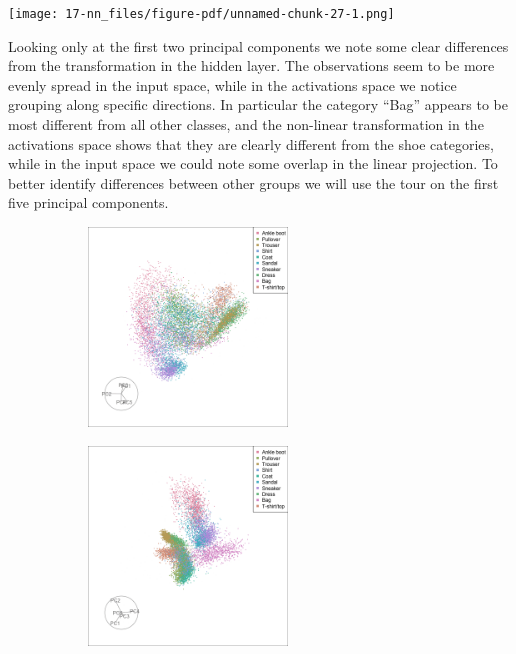 \documentclass[
  letterpaper,
]{krantz}
\begin{document}
\texttt{[image: 17-nn\_files/figure-pdf/unnamed-chunk-27-1.png]}

Looking only at the first two principal components we note some clear
differences from the transformation in the hidden layer. The
observations seem to be more evenly spread in the input space, while in
the activations space we notice grouping along specific directions. In
particular the category ``Bag'' appears to be most different from all
other classes, and the non-linear transformation in the activations
space shows that they are clearly different from the shoe categories,
while in the input space we could note some overlap in the linear
projection. To better identify differences between other groups we will
use the tour on the first five principal components.

\begin{figure}

\begin{minipage}{0.50\linewidth}

\begin{figure}[H]

{\centering \includegraphics[width=2.08333in,height=\textheight,keepaspectratio]{images/fashion_images_gt_36.png}

}


\end{figure}%

\end{minipage}%
%
\begin{minipage}{0.50\linewidth}

\begin{figure}[H]

{\centering \includegraphics[width=2.08333in,height=\textheight,keepaspectratio]{images/fashion_activation_gt_126.png}

}
\end{figure}
\end{minipage}
\end{figure}
\end{document}
